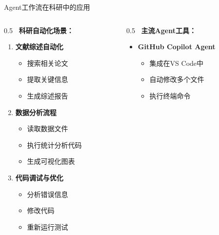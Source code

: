 \documentclass[aspectratio=169,11pt]{beamer}
\begin{document}
\begin{frame}{Agent工作流在科研中的应用}
    \begin{columns}
        \begin{column}{0.5\textwidth}
            \textbf{\faFlask\ 科研自动化场景：}
            \begin{enumerate}
                \item \textbf{文献综述自动化}
                    \begin{itemize}
                        \item 搜索相关论文
                        \item 提取关键信息
                        \item 生成综述报告
                    \end{itemize}
                \item \textbf{数据分析流程}
                    \begin{itemize}
                        \item 读取数据文件
                        \item 执行统计分析代码
                        \item 生成可视化图表
                    \end{itemize}
                \item \textbf{代码调试与优化}
                    \begin{itemize}
                        \item 分析错误信息
                        \item 修改代码
                        \item 重新运行测试
                    \end{itemize}
            \end{enumerate}
        \end{column}
        \begin{column}{0.5\textwidth}
            \textbf{\faRobot\ 主流Agent工具：}
            \begin{itemize}
                \item \textbf{GitHub Copilot Agent}
                    \begin{itemize}
                        \item 集成在VS Code中
                        \item 自动修改多个文件
                        \item 执行终端命令
                    \end{itemize}

\end{itemize}
\end{column}
\end{columns}
\end{frame}
\end{document}
